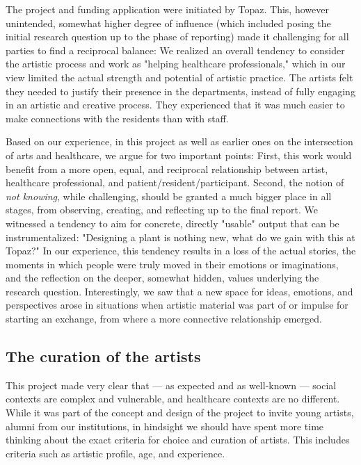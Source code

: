 \documentclass[authordate, empirical,issue]{jote-new-article}
\begin{document}
	
	{



	The project and funding application were initiated by Topaz. This, however unintended, somewhat higher degree of influence (which included posing the initial research question up to the phase of reporting) made it challenging for all parties to find a reciprocal balance: We realized an overall tendency to consider the artistic process and work as "helping healthcare professionals," which in our view limited the actual strength and potential of artistic practice. The artists felt they needed to justify their presence in the departments, instead of fully engaging in an artistic and creative process. They experienced that it was much easier to make connections with the residents than with staff.







	Based on our experience, in this project as well as earlier ones on the intersection of arts and healthcare, we argue for two important points: First, this work would benefit from a more open, equal, and reciprocal relationship between artist, healthcare professional, and patient/resident/participant. Second, the notion of \emph{not knowing}, while challenging, should be granted a much bigger place in all stages, from observing, creating, and reflecting up to the final report. We witnessed a tendency to aim for concrete, directly "usable" output that can be instrumentalized: "Designing a plant is nothing new, what do we gain with this at Topaz?" In our experience, this tendency results in a loss of the actual stories, the moments in which people were truly moved in their emotions or imaginations, and the reflection on the deeper, somewhat hidden, values underlying the research question. Interestingly, we saw that a new space for ideas, emotions, and perspectives arose in situations when artistic material was part of or impulse for starting an exchange, from where a more connective relationship emerged.



	\subsection{The curation of the artists}

	

	This project made very clear that --- as expected and as well-known --- social contexts are complex and vulnerable, and healthcare contexts are no different. While it was part of the concept and design of the project to invite young artists, alumni from our institutions, in hindsight we should have spent more time thinking about the exact criteria for choice and curation of artists. This includes criteria such as artistic profile, age, and experience.



}
\end{document}

